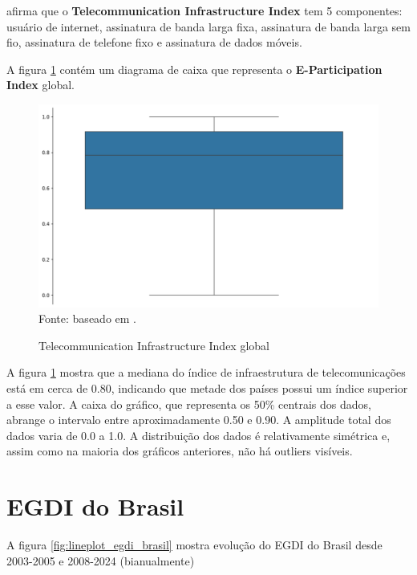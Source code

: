 \cite{ONU_EGDI_methodology} afirma que o \textbf{Telecommunication Infrastructure Index} tem 5 componentes: usuário de internet, assinatura de banda larga fixa, assinatura de banda larga sem fio, assinatura de telefone fixo e assinatura de dados móveis.

A figura \ref{fig:boxplot_tci_global} contém um diagrama de caixa que representa o \textbf{E-Participation Index} global.

\begin{figure}[H]
	\centering
	\caption{Telecommunication Infrastructure Index global}
	\includegraphics[width=1\linewidth]{figuras/egdi/boxplot_tci_global.png}
	\label{fig:boxplot_tci_global}
	\footnotesize{Fonte: baseado em \cite{ONU_EGDI_mapa}.}
\end{figure}

A figura \ref{fig:boxplot_tci_global} mostra que a mediana do índice de infraestrutura de telecomunicações está em cerca de 0.80, indicando que metade dos países possui um índice superior a esse valor. A caixa do gráfico, que representa os 50\% centrais dos dados, abrange o intervalo entre aproximadamente 0.50 e 0.90. A amplitude total dos dados varia de 0.0 a 1.0. A distribuição dos dados é relativamente simétrica e, assim como na maioria dos gráficos anteriores, não há outliers visíveis.

\section{EGDI do Brasil}

A figura \ref{fig:lineplot_egdi_brasil} mostra evolução do EGDI do Brasil desde 2003-2005 e 2008-2024 (bianualmente)

